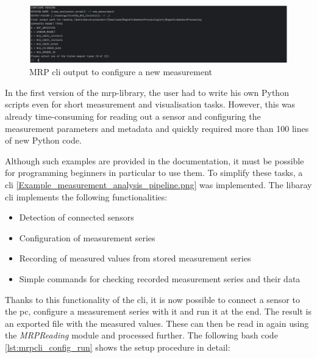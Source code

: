 \begin{figure}
\centering
\includegraphics{./generated_images/border_MRP_(+cli)_output_to_configure_a_new_measurement.png}
\caption{MRP \gls{cli} output to configure a new measurement
\label{MRP_(+cli)_output_to_configure_a_new_measurement.png}}
\end{figure}

In the first version of the \gls{mrp}-library, the user had to write his
own Python scripts even for short measurement and visualisation tasks.
However, this was already time-consuming for reading out a sensor and
configuring the measurement parameters and metadata and quickly required
more than 100 lines of new Python code.

Although such examples are provided in the documentation, it must be
possible for programming beginners in particular to use them. To
simplify these tasks, a \gls{cli}
\ref{Example_measurement_analysis_pipeline.png} was implemented. The
libaray \gls{cli} implements the following functionalities:

\begin{itemize}
\tightlist
\item
  Detection of connected sensors
\item
  Configuration of measurement series
\item
  Recording of measured values from stored measurement series
\item
  Simple commands for checking recorded measurement series and their
  data
\end{itemize}

Thanks to this functionality of the \gls{cli}, it is now possible to
connect a sensor to the \gls{pc}, configure a measurement series with it
and run it at the end. The result is an exported file with the measured
values. These can then be read in again using the \emph{MRPReading}
module and processed further. The following bash code
\ref{lst:mrpcli_config_run} shows the setup procedure in detail:


